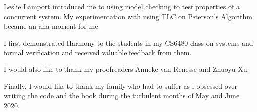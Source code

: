 \documentclass{report}
\begin{document}
Leslie Lamport introduced me to using model checking to test properties
of a concurrent system.  My experimentation with using TLC on Peterson's
Algorithm became an aha moment for me.

I first demonstrated Harmony to the students in my CS6480 class on systems
and formal verification and
received valuable feedback from them.

I would also like to thank my proofreaders Anneke van Renesse and
Zhuoyu Xu.

Finally, I would like to thank my family who had to suffer as I obsessed
over writing the code and the book during the turbulent months of
May and June 2020.


\cleardoublepage
{}
\printindex

\cleardoublepage
{}
\printglossaries
\end{document}
